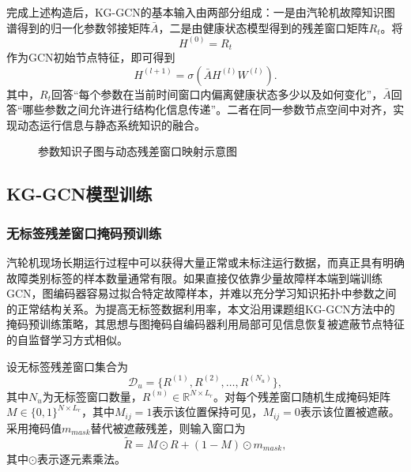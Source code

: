 完成上述构造后，KG-GCN的基本输入由两部分组成：一是由汽轮机故障知识图谱得到的归一化参数邻接矩阵$\bar A$，二是由健康状态模型得到的残差窗口矩阵$R_t$。将
\begin{equation}
    H^{(0)}=R_t
\end{equation}
作为GCN初始节点特征，即可得到
\begin{equation}
    H^{(l+1)}=\sigma\left(\bar A H^{(l)}W^{(l)}\right).
\end{equation}
其中，$R_t$回答“每个参数在当前时间窗口内偏离健康状态多少以及如何变化”，$\bar A$回答“哪些参数之间允许进行结构化信息传递”。二者在同一参数节点空间中对齐，实现动态运行信息与静态系统知识的融合。

\begin{figure}[htbp]
    \centering
    \caption{参数知识子图与动态残差窗口映射示意图}
    \label{fig:kg_residual_mapping}
\end{figure}

\subsection{KG-GCN模型训练}
\label{subsec:kg_gcn_training}

\subsubsection{无标签残差窗口掩码预训练}

汽轮机现场长期运行过程中可以获得大量正常或未标注运行数据，而真正具有明确故障类别标签的样本数量通常有限。如果直接仅依靠少量故障样本端到端训练GCN，图编码器容易过拟合特定故障样本，并难以充分学习知识拓扑中参数之间的正常结构关系。为提高无标签数据利用率，本文沿用课题组KG-GCN方法中的掩码预训练策略\cite{YangHaodong2026CFB}，其思想与图掩码自编码器利用局部可见信息恢复被遮蔽节点特征的自监督学习方式相似\cite{Hou2022GraphMAE}。

设无标签残差窗口集合为
\begin{equation}
    \mathcal D_u=\{R^{(1)},R^{(2)},\ldots,R^{(N_u)}\},
\end{equation}
其中$N_u$为无标签窗口数量，$R^{(n)}\in\mathbb R^{N\times L_r}$。对每个残差窗口随机生成掩码矩阵$M\in\{0,1\}^{N\times L_r}$，其中$M_{ij}=1$表示该位置保持可见，$M_{ij}=0$表示该位置被遮蔽。采用掩码值$m_{mask}$替代被遮蔽残差，则输入窗口为
\begin{equation}
    \tilde R=M\odot R+(1-M)\odot m_{mask},
\end{equation}
其中$\odot$表示逐元素乘法。

